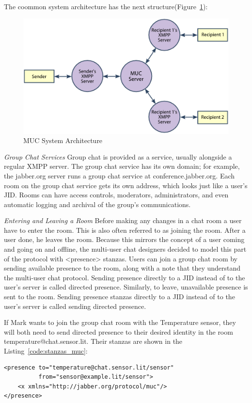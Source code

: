 The coommon system architecture has the next structure(Figure~\ref{img:muc-architecture}):
  \begin{figure}[!ht]
		\centering
		\includegraphics[scale=0.8]{images/MUC.png}   
		\caption[MUC]{MUC System Architecture}     
		\label{img:muc-architecture}                    
		\end{figure}

\emph{Group Chat Services}
\newline
Group chat is provided as a service, usually alongside a regular XMPP server. The group chat service has its own domain; for example, the jabber.org server runs a group chat service at conference.jabber.org. Each room on the group chat service gets its own address, which looks just like a user’s JID. Rooms can have access controls, moderators, administrators, and even automatic logging and archival of the group’s communications.

\emph{Entering and Leaving a Room}
\newline
Before making any changes in a chat room a user have to enter the room. This is also often referred to as joining the room. After a user done, he leaves the room. Because this mirrors the concept of a user coming and going on and offline, the multi-user chat designers decided to model this part of the protocol with <presence> stanzas. Users can join a group chat room by sending available presence to the room, along with a note that they understand the multi-user chat protocol. Sending presence directly to a JID instead of to the user’s server is called directed presence. Similarly, to leave, unavailable presence is sent to the room. Sending presence stanzas directly to a JID instead of to the user’s server is called sending directed presence.

If Mark wants to join the group chat room with the Temperature sensor, they will both need to send directed presence to their desired identity in the room temperature@chat.sensor.lit. Their stanzas are shown in the Listing~\ref{code:stanzas_muc}:
\begin{lstlisting}[label=code:stanzas_muc,caption=Stanzas Format for MUC]
<presence to="temperature@chat.sensor.lit/sensor"
          from="sensor@example.lit/sensor">
    <x xmlns="http://jabber.org/protocol/muc"/>
</presence>
\end{lstlisting}

